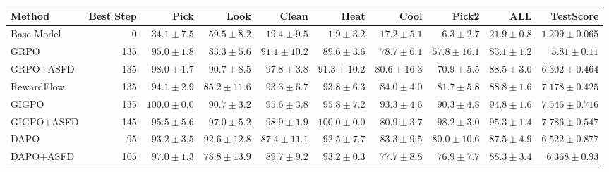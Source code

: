 \begin{tabular}{lrrrrrrrrr}
\toprule
Method & Best Step & Pick & Look & Clean & Heat & Cool & Pick2 & ALL & TestScore \\
\midrule
Base Model & 0 & $34.1 \pm 7.5$ & $59.5 \pm 8.2$ & $19.4 \pm 9.5$ & $1.9 \pm 3.2$ & $17.2 \pm 5.1$ & $6.3 \pm 2.7$ & $21.9 \pm 0.8$ & $1.209 \pm 0.065$ \\
GRPO & 135 & $95.0 \pm 1.8$ & $83.3 \pm 5.6$ & $91.1 \pm 10.2$ & $89.6 \pm 3.6$ & $78.7 \pm 6.1$ & $57.8 \pm 16.1$ & $83.1 \pm 1.2$ & $5.81 \pm 0.11$ \\
GRPO+ASFD & 135 & $98.0 \pm 1.7$ & $90.7 \pm 8.5$ & $97.8 \pm 3.8$ & $91.3 \pm 10.2$ & $80.6 \pm 16.3$ & $70.9 \pm 5.5$ & $88.5 \pm 3.0$ & $6.302 \pm 0.464$ \\
RewardFlow & 135 & $94.1 \pm 2.9$ & $85.2 \pm 11.6$ & $93.3 \pm 6.7$ & $93.8 \pm 6.3$ & $84.0 \pm 4.0$ & $81.7 \pm 5.8$ & $88.8 \pm 1.6$ & $7.178 \pm 0.425$ \\
GIGPO & 135 & $100.0 \pm 0.0$ & $90.7 \pm 3.2$ & $95.6 \pm 3.8$ & $95.8 \pm 7.2$ & $93.3 \pm 4.6$ & $90.3 \pm 4.8$ & $94.8 \pm 1.6$ & $7.546 \pm 0.716$ \\
GIGPO+ASFD & 145 & $95.5 \pm 5.6$ & $97.0 \pm 5.2$ & $98.9 \pm 1.9$ & $100.0 \pm 0.0$ & $80.9 \pm 3.7$ & $98.2 \pm 3.0$ & $95.3 \pm 1.4$ & $7.786 \pm 0.547$ \\
DAPO & 95 & $93.2 \pm 3.5$ & $92.6 \pm 12.8$ & $87.4 \pm 11.1$ & $92.5 \pm 7.7$ & $83.3 \pm 9.5$ & $80.0 \pm 10.6$ & $87.5 \pm 4.9$ & $6.522 \pm 0.877$ \\
DAPO+ASFD & 105 & $97.0 \pm 1.3$ & $78.8 \pm 13.9$ & $89.7 \pm 9.2$ & $93.2 \pm 0.3$ & $77.7 \pm 8.8$ & $76.9 \pm 7.7$ & $88.3 \pm 3.4$ & $6.368 \pm 0.93$ \\
\bottomrule
\end{tabular}
